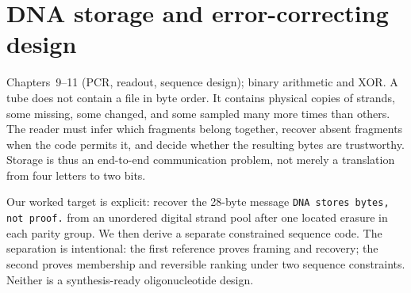 \chapter{DNA storage and error-correcting design}
{Chapters~9--11 (PCR, readout, sequence design); binary arithmetic and XOR.}
A tube does not contain a file in byte order. It contains physical copies of strands,
some missing, some changed, and some sampled many more times than others. The reader
must infer which fragments belong together, recover absent fragments when the code
permits it, and decide whether the resulting bytes are trustworthy. Storage is thus
an end-to-end communication problem, not merely a translation from four letters
to two bits.

Our worked target is explicit: recover the 28-byte message
\texttt{DNA stores bytes, not proof.} from an unordered digital strand pool after
one located erasure in each parity group. We then derive a separate constrained
sequence code. The separation is intentional: the first reference proves
framing and recovery; the second proves membership and reversible ranking under
two sequence constraints. Neither is a synthesis-ready oligonucleotide design.


